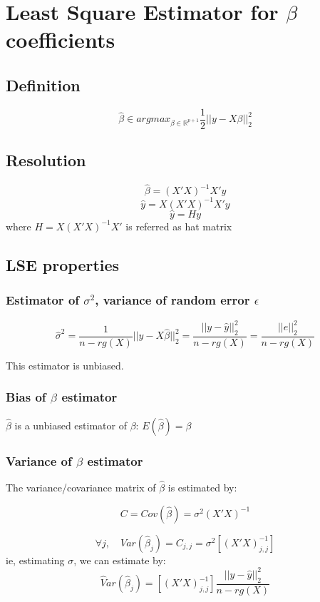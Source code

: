 \documentclass[a4paper]{article}
\theoremstyle{plain}
\begin{document}
\pagebreak
\section{Least Square Estimator for $\beta $ coefficients}

\subsection{Definition}
$$ \hat \beta \in argmax_{\beta \in \mathbb{R}^{p+1}} \frac{1}{2}||y-X\beta||^2_2$$ 

\subsection{Resolution}

$$ \hat \beta = (X'X)^{-1}X'y$$
$$ \hat y = X(X'X)^{-1}X'y $$
$$ \hat y = Hy $$
where $H=X(X'X)^{-1}X'$ is referred as hat matrix

\subsection{LSE properties}

\subsubsection{Estimator of $\sigma^2$, variance of random error $\epsilon$}

$$\hat \sigma^2 = \frac{1}{n-rg(X)}||y-X\hat \beta||^2_2 = \frac{||y-\hat y||^2_2}{n-rg(X)} = \frac{||e||^2_2}{n-rg(X)}$$

This estimator is unbiased.

\subsubsection{Bias of $\beta$ estimator}

$\hat \beta$ is a unbiased estimator of $\beta$: $E(\hat \beta) = \beta$

\subsubsection{Variance of $\beta$ estimator}
The variance/covariance matrix of $\hat \beta$ is estimated by:

$$C = Cov(\hat \beta) = \sigma^2 (X'X)^{-1}$$

$$\forall j, \quad Var(\hat \beta_j)= C_{j,j}= \sigma^2 [(X'X)^{-1}_{j,j}] $$
ie, estimating $\sigma$, we can estimate by:
$$ 
\hat Var(\hat \beta_j) =  
[(X'X)^{-1}_{j,j}] 
\frac{||y-\hat y||^2_2}{n-rg(X)}
$$
\end{document}
